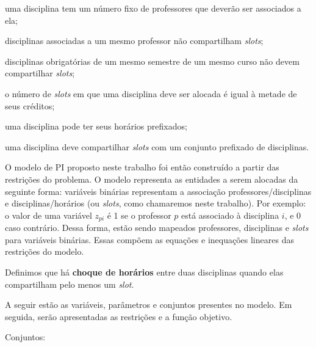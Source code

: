 \begin{alineascomponto}
\item uma disciplina tem um número fixo de professores que deverão ser associados a ela;
\item disciplinas associadas a um mesmo professor não compartilham \textit{slots};
\item disciplinas obrigatórias de um mesmo semestre de um mesmo curso não devem compartilhar \textit{slots};
\item o número de \textit{slots} em que uma disciplina deve ser alocada é igual à metade de seus créditos;
\item uma disciplina pode ter seus horários prefixados;
\item uma disciplina deve compartilhar \textit{slots} com um conjunto prefixado de disciplinas.  
\end{alineascomponto} 

O modelo de PI proposto neste trabalho foi então construído a partir das restrições do problema. O modelo representa as entidades a serem alocadas da seguinte forma: variáveis binárias representam a associação professores/disciplinas e disciplinas/horários (ou \textit{slots}, como chamaremos neste trabalho). Por exemplo: o valor de uma variável $z_{pi}$ é 1 se o professor $p$ está associado à disciplina $i$, e 0 caso contrário. Dessa forma, estão sendo mapeados professores, disciplinas e \textit{slots} para variáveis binárias. Essas compõem as equações e inequações lineares das restrições do modelo.

Definimos que há \textbf{choque de horários} entre duas disciplinas quando elas compartilham pelo menos um \textit{slot}.

A seguir estão as variáveis, parâmetros e conjuntos presentes no modelo. Em seguida, serão apresentadas as restrições e a função objetivo.

Conjuntos:

